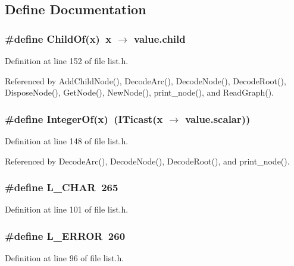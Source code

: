 \subsection{Define Documentation}
\subsubsection{\setlength{\rightskip}{0pt plus 5cm}\#define Child\-Of(x)~x $\rightarrow$ value.child}\label{list_8h_7757c3b668ea929386d2c92b24f46d57}




Definition at line 152 of file list.h.

Referenced by Add\-Child\-Node(), Decode\-Arc(), Decode\-Node(), Decode\-Root(), Dispose\-Node(), Get\-Node(), New\-Node(), print\_\-node(), and Read\-Graph().
\subsubsection{\setlength{\rightskip}{0pt plus 5cm}\#define Integer\-Of(x)~(ITicast(x $\rightarrow$ value.scalar))}\label{list_8h_d4e1ced487597a40479f938b6ed09a87}




Definition at line 148 of file list.h.

Referenced by Decode\-Arc(), Decode\-Node(), Decode\-Root(), and print\_\-node().
\subsubsection{\setlength{\rightskip}{0pt plus 5cm}\#define L\_\-CHAR~265}\label{list_8h_bf20d2179f811b0386ef9407f4797506}




Definition at line 101 of file list.h.
\subsubsection{\setlength{\rightskip}{0pt plus 5cm}\#define L\_\-ERROR~260}\label{list_8h_48538932682d4fe3cdf01547db361240}




Definition at line 96 of file list.h.
